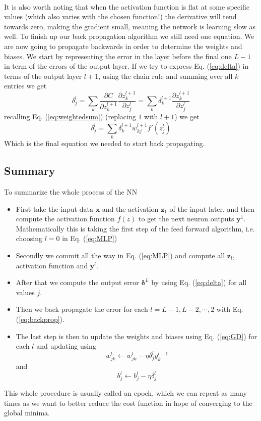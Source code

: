 \documentclass[12pt, a4paper]{book}
\begin{document}
\\It is also worth noting that when the activation function is flat at some specific values (which also varies with the chosen function!) the derivative will tend towards zero, making the gradient small, 
meaning the network is learning slow as well. To finish up our back propagation algorithm we still need one equation. We are now going to propagate backwards in order to determine the weights and biases. 
We start by representing the error in the layer before the final one $L-1$ in term of the errors of the output layer. If we try to express Eq. (\ref{eq:delta}) in terms of the output layer $l+1$, 
using the chain rule and summing over all $k$ entries we get
$$
\delta_j^l=\sum_k\frac{\partial C}{\partial z_k^{l+1}}\frac{\partial z_k^{l+1}}{\partial z_j^l} =\sum_k \delta_k^{l+1}\frac{\partial z_k^{l+1}}{\partial z_j^l}
$$
recalling Eq. (\ref{eq:weightedsum}) (replacing $1$ with $l+1$) we get
\begin{equation}\label{eq:backprop}
    \delta_j^l=\sum_k\delta_k^{l+1}w_{kj}^{l+1}f'(z_j^l)
\end{equation}
Which is the final equation we needed to start back propagating. 

\subsection{Summary}
To summarize the whole process of the NN
\begin{itemize}
    \item First take the input data $\mathbf{x}$ and the activation $\mathbf{z}_1$ of the input later, and then compute the activation function $f(z)$ to get the next neuron outputs $\mathbf{y}^1$. 
    Mathematically this is taking the first step of the feed forward algorithm, i.e. choosing $l=0$ in Eq. (\ref{eq:MLP})
    \item Secondly we commit all the way in Eq. (\ref{eq:MLP}) and compute all $\mathbf{z}_l$, activation function and $\mathbf{y}^l$.
    \item After that we compute the output error $\bm{\delta}^L$ by using Eq. (\ref{eq:delta}) for all values $j$.
    \item Then we back propagate the error for each $l=L-1,L-2,\cdots,2$ with Eq. (\ref{eq:backprop}).
    \item The last step is then to update the weights and biases using Eq. (\ref{eq:GD}) for each $l$ and updating using
    $$
    w_{jk}^l\leftarrow w_{jk}^l-\eta\delta_j^ly_k^{l-1}
    $$
    and
    $$
    b_j^l \leftarrow b_j^l-\eta\delta_j^l
    $$
\end{itemize}
This whole procedure is usually called an epoch, which we can repeat as many times as we want to better reduce the cost function in hope of converging to the global minima.
\end{document}

